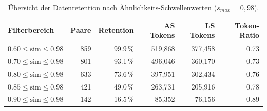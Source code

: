 
\begin{table}[htbp]
\centering\small
\caption{Übersicht der Datenretention nach Ähnlichkeits-Schwellenwerten ($s_{max} = 0{,}98$).}
\label{tab:similarity_threshold_corpus}
\begin{tabular}{@{}lrrrrr@{}}
\toprule
\textbf{Filterbereich} & \textbf{Paare} & \textbf{Retention} & \textbf{AS Tokens} & \textbf{LS Tokens} & \textbf{Token-Ratio} \\
\midrule
$0.60 \le \text{sim} \le 0.98$ & 859 & 99.9\,\% & 519,868 & 377,458 & 0.73 \\
$0.70 \le \text{sim} \le 0.98$ & 801 & 93.1\,\% & 496,046 & 360,170 & 0.73 \\
$0.80 \le \text{sim} \le 0.98$ & 633 & 73.6\,\% & 397,951 & 302,434 & 0.76 \\
$0.85 \le \text{sim} \le 0.98$ & 421 & 49.0\,\% & 263,731 & 205,916 & 0.78 \\
$0.90 \le \text{sim} \le 0.98$ & 142 & 16.5\,\% & 85,352 & 76,156 & 0.89 \\
\bottomrule
\end{tabular}
\end{table}


